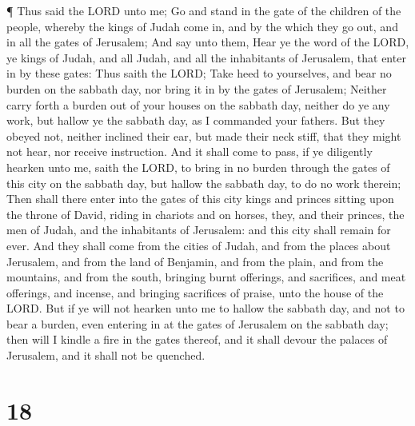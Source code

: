  ¶ Thus said the LORD unto me; Go and stand in the gate of
the children of the people, whereby the kings of Judah come in, and by
the which they go out, and in all the gates of Jerusalem; 
And say unto them, Hear ye the word of the LORD, ye kings of Judah, and
all Judah, and all the inhabitants of Jerusalem, that enter in by these
gates:  Thus saith the LORD; Take heed to yourselves, and
bear no burden on the sabbath day, nor bring it in by the gates of
Jerusalem;  Neither carry forth a burden out of your houses
on the sabbath day, neither do ye any work, but hallow ye the sabbath
day, as I commanded your fathers.  But they obeyed not,
neither inclined their ear, but made their neck stiff, that they might
not hear, nor receive instruction.  And it shall come to
pass, if ye diligently hearken unto me, saith the LORD, to bring in no
burden through the gates of this city on the sabbath day, but hallow the
sabbath day, to do no work therein;  Then shall there enter
into the gates of this city kings and princes sitting upon the throne of
David, riding in chariots and on horses, they, and their princes, the
men of Judah, and the inhabitants of Jerusalem: and this city shall
remain for ever.  And they shall come from the cities of
Judah, and from the places about Jerusalem, and from the land of
Benjamin, and from the plain, and from the mountains, and from the
south, bringing burnt offerings, and sacrifices, and meat offerings, and
incense, and bringing sacrifices of praise, unto the house of the LORD.
 But if ye will not hearken unto me to hallow the sabbath
day, and not to bear a burden, even entering in at the gates of
Jerusalem on the sabbath day; then will I kindle a fire in the gates
thereof, and it shall devour the palaces of Jerusalem, and it shall not
be quenched.

\hypertarget{section-17}{%
\section{18}\label{section-17}}

